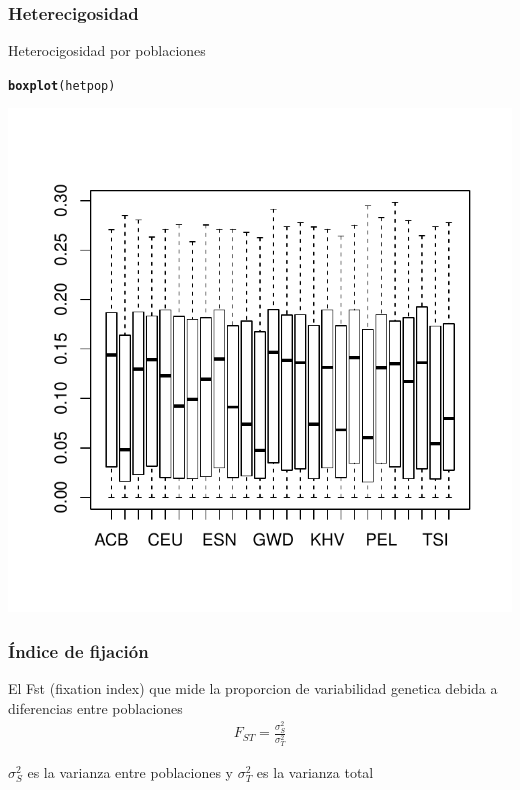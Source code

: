 \documentclass{beamer}\usepackage[]{graphicx}\usepackage[]{color}
\makeatletter
\newcommand{\hlstd}[1]{\textcolor[rgb]{0.345,0.345,0.345}{#1}}%
\newcommand{\hlkwd}[1]{\textcolor[rgb]{0.737,0.353,0.396}{\textbf{#1}}}%
\newenvironment{kframe}{%
 \def\at@end@of@kframe{}%
 \ifinner\ifhmode%
  \def\at@end@of@kframe{\end{minipage}}%
  \begin{minipage}{\columnwidth}%
 \fi\fi%
 \def\FrameCommand##1{\hskip\@totalleftmargin \hskip-\fboxsep
 \colorbox{shadecolor}{##1}\hskip-\fboxsep
     \hskip-\linewidth \hskip-\@totalleftmargin \hskip\columnwidth}%
 \MakeFramed {\advance\hsize-\width
   \@totalleftmargin\z@ \linewidth\hsize
   \@setminipage}}%
 {\par\unskip\endMakeFramed%
 \at@end@of@kframe}
\newenvironment{knitrout}{}{} %
\makeatother
\begin{document}
\begin{frame}[fragile]
\frametitle{Heterecigosidad}
Heterocigosidad por poblaciones

\begin{knitrout}\footnotesize
{}\color{fgcolor}\begin{kframe}
\begin{alltt}
\hlkwd{boxplot}\hlstd{(hetpop)}
\end{alltt}
\end{kframe}
\includegraphics[width=.45\linewidth]{figure/unnamed-chunk-13-1} 

\end{knitrout}
\end{frame}



\begin{frame}[fragile]
\frametitle{\'Indice de fijaci\'on}

El Fst (fixation index) que mide la proporcion de variabilidad genetica debida a diferencias entre poblaciones 
\begin{eqnarray}
F_{ST}=\frac{\sigma^2_S}{\sigma^2_T}
\end{eqnarray}

$\sigma^2_S$ es la varianza entre poblaciones y $\sigma^2_T$ es la varianza total
\end{frame}
\end{document}

